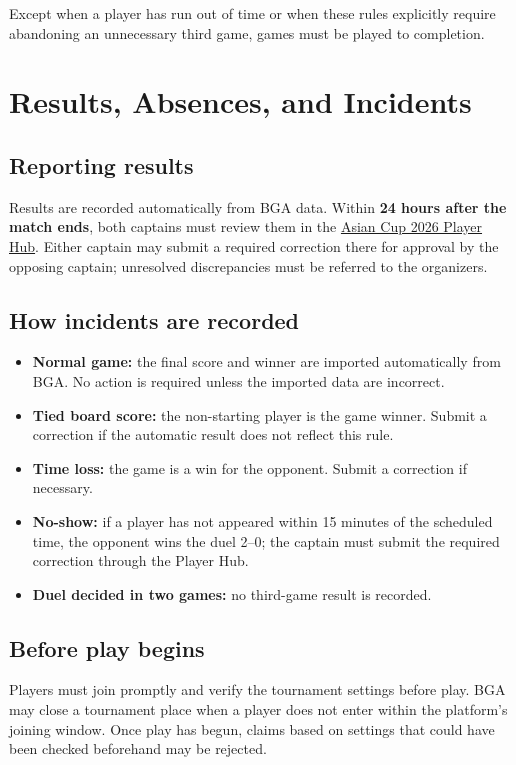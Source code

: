 \documentclass[10pt,a4paper]{article}
\newcommand{\term}[1]{\textbf{#1}}
\newcommand{\PlayerHub}{\href{https://carcassonne.gg/player-hub/tournaments/?id=Asian-Cup-2026}{Asian Cup 2026 Player Hub}}
\begin{document}
Except when a player has run out of time or when these rules explicitly require
abandoning an unnecessary third game, games must be played to completion.

\section{Results, Absences, and Incidents}

\subsection{Reporting results}

Results are recorded automatically from BGA data. Within \term{24 hours after
the match ends}, both captains must review them in the \PlayerHub. Either
captain may submit a required correction there for approval by the opposing
captain; unresolved discrepancies must be referred to the organizers.

\subsection{How incidents are recorded}

\begin{itemize}
  \item \term{Normal game:} the final score and winner are imported
        automatically from BGA. No action is required unless the imported data
        are incorrect.
  \item \term{Tied board score:} the non-starting player is the game winner.
        Submit a correction if the automatic result does not reflect this rule.
  \item \term{Time loss:} the game is a win for the opponent. Submit a
        correction if necessary.
  \item \term{No-show:} if a player has not appeared within 15 minutes of the
        scheduled time, the opponent wins the duel 2--0; the captain must submit
        the required correction through the Player Hub.
  \item \term{Duel decided in two games:} no third-game result is recorded.
\end{itemize}

\subsection{Before play begins}

Players must join promptly and verify the tournament settings before play. BGA
may close a tournament place when a player does not enter within the platform's
joining window. Once play has begun, claims based on settings that could have
been checked beforehand may be rejected.
\end{document}
